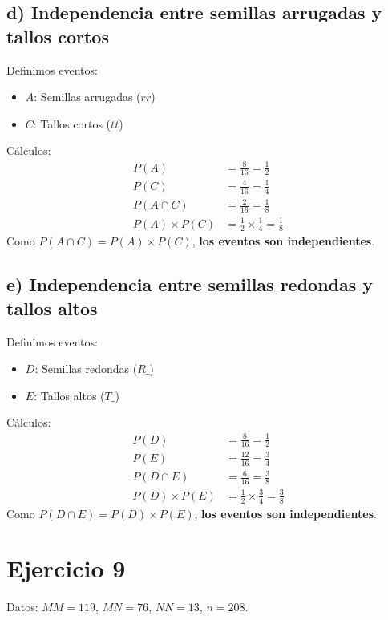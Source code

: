 \documentclass{article}
\begin{document}
	\subsection*{d) Independencia entre semillas arrugadas y tallos cortos}
	
	Definimos eventos:
	\begin{itemize}
		\item $A$: Semillas arrugadas ($rr$)
		\item $C$: Tallos cortos ($tt$)
	\end{itemize}
	
	Cálculos:
	\begin{align*}
		P(A) &= \frac{8}{16} = \frac{1}{2} \\
		P(C) &= \frac{4}{16} = \frac{1}{4} \\
		P(A \cap C) &= \frac{2}{16} = \frac{1}{8} \\
		P(A) \times P(C) &= \frac{1}{2} \times \frac{1}{4} = \frac{1}{8}
	\end{align*}
	Como $P(A \cap C) = P(A) \times P(C)$, \textbf{los eventos son independientes}.
	
	\subsection*{e) Independencia entre semillas redondas y tallos altos}
	
	Definimos eventos:
	\begin{itemize}
		\item $D$: Semillas redondas ($R\_$)
		\item $E$: Tallos altos ($T\_$)
	\end{itemize}
	
	Cálculos:
	\begin{align*}
		P(D) &= \frac{8}{16} = \frac{1}{2} \\
		P(E) &= \frac{12}{16} = \frac{3}{4} \\
		P(D \cap E) &= \frac{6}{16} = \frac{3}{8} \\
		P(D) \times P(E) &= \frac{1}{2} \times \frac{3}{4} = \frac{3}{8}
	\end{align*}
	Como $P(D \cap E) = P(D) \times P(E)$, \textbf{los eventos son independientes}.
	
	
	\section*{Ejercicio 9}
	Datos: \( MM = 119 \), \( MN = 76 \), \( NN = 13 \), \( n = 208 \).
	
\end{document}
